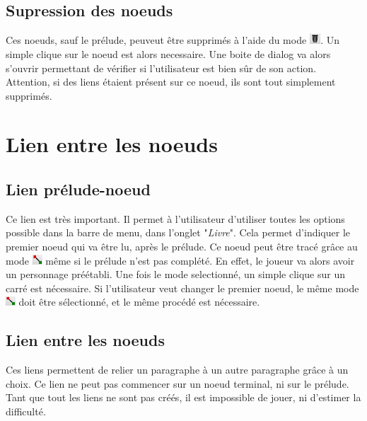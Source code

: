 \begin{description}
		\subsection{Supression des noeuds}
			Ces noeuds, sauf le prélude, peuveut être supprimés à l'aide du mode \includegraphics[height=0.4cm]{img/modeSupression.png}. Un simple clique sur le noeud est alors necessaire. Une boite de dialog va alors s'ouvrir permettant de vérifier si l'utilisateur est bien sûr de son action. Attention, si des liens étaient présent sur ce noeud, ils sont tout simplement supprimés.

	\section{Lien entre les noeuds}\label{chapter:lien}
	\label{sec:prerequis}

	\subsection{Lien prélude-noeud}
		Ce lien est très important. Il permet à l'utilisateur d'utiliser toutes les options possible dans la barre de menu, dans l'onglet "\textit{Livre}". Cela permet d'indiquer le premier noeud qui va être lu, après le prélude. Ce noeud peut être tracé grâce au mode \includegraphics[height=10pt]{img/modePreludeNoeud.png} même si le prélude n'est pas complété. En effet, le joueur va alors avoir un personnage préétabli.
		Une fois le mode selectionné, un simple clique sur un carré est nécessaire. Si l'utilisateur veut changer le premier noeud, le même mode \includegraphics[height=10pt]{img/modePreludeNoeud.png} doit être sélectionné, et le même procédé est nécessaire.

	\subsection{Lien entre les noeuds}
		Ces liens permettent de relier un paragraphe à un autre paragraphe grâce à un choix. Ce lien ne peut pas commencer sur un noeud terminal, ni sur le prélude. Tant que tout les liens ne sont pas créés, il est impossible de jouer, ni d'estimer la difficulté.\\


\end{description}
